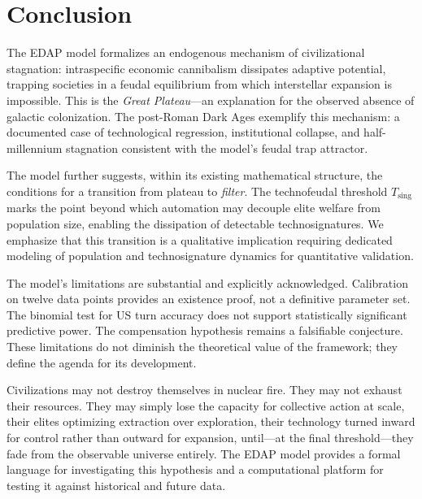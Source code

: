\section{Conclusion}

The EDAP model formalizes an endogenous mechanism of civilizational stagnation: intraspecific economic cannibalism dissipates adaptive potential, trapping societies in a feudal equilibrium from which interstellar expansion is impossible. This is the \emph{Great Plateau}---an explanation for the observed absence of galactic colonization. The post-Roman Dark Ages exemplify this mechanism: a documented case of technological regression, institutional collapse, and half-millennium stagnation consistent with the model's feudal trap attractor.

The model further suggests, within its existing mathematical structure, the conditions for a transition from plateau to \emph{filter}. The technofeudal threshold $T_{\text{sing}}$ marks the point beyond which automation may decouple elite welfare from population size, enabling the dissipation of detectable technosignatures. We emphasize that this transition is a qualitative implication requiring dedicated modeling of population and technosignature dynamics for quantitative validation.

The model's limitations are substantial and explicitly acknowledged. Calibration on twelve data points provides an existence proof, not a definitive parameter set. The binomial test for US turn accuracy does not support statistically significant predictive power. The compensation hypothesis remains a falsifiable conjecture. These limitations do not diminish the theoretical value of the framework; they define the agenda for its development.

Civilizations may not destroy themselves in nuclear fire. They may not exhaust their resources. They may simply lose the capacity for collective action at scale, their elites optimizing extraction over exploration, their technology turned inward for control rather than outward for expansion, until---at the final threshold---they fade from the observable universe entirely. The EDAP model provides a formal language for investigating this hypothesis and a computational platform for testing it against historical and future data.
